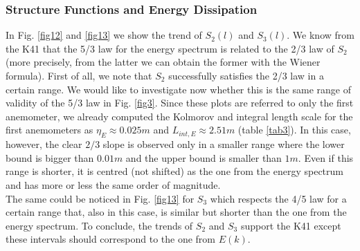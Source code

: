 \documentclass[11pt,titlepage]{article}
\begin{document}
\subsubsection{Structure Functions and Energy Dissipation}
In Fig. \ref{fig12} and  \ref{fig13} we show the trend of $S_2(l)$ and $S_3(l)$. We know from the K41 that the 5/3 law for the energy spectrum is related to the 2/3 law of $S_2$ (more precisely, from the latter we can obtain the former with the Wiener formula). First of all, we note that $S_2$ successfully satisfies the 2/3 law in a certain range. We would like to investigate now whether this is the same range of validity of the 5/3 law in Fig. \ref{fig3}. Since these plots are referred to only the first anemometer, we already computed the Kolmorov and integral length scale for the first anemometers as $\eta_E \approx 0.025m$ and $L_{int,E} \approx 2.51m$ (table \ref{tab3}). In this case, however, the clear $2/3$ slope is observed only in a smaller range where the lower bound is bigger than $0.01m$ and the upper bound is smaller than $1m$. Even if this range is shorter, it is centred (not shifted) as the one from the energy spectrum and has more or less the same order of magnitude. \\
The same could be noticed in Fig. \ref{fig13} for $S_3$ which respects the 4/5 law for a certain range that, also in this case, is similar but shorter than the one from the energy spectrum. To conclude, the trends of $S_2$ and $S_3$ support the K41 except these intervals should correspond to the one from $E(k)$. \\
\end{document}
